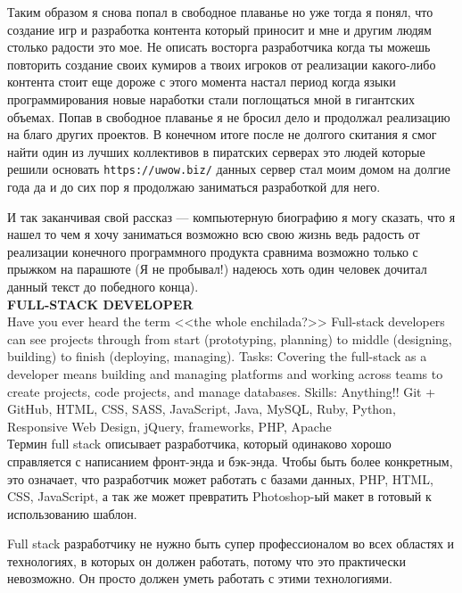\documentclass[14pt,a4paper,oneside]{extbook}
\begin{document}
		Таким образом я снова попал в свободное плаванье но уже тогда я понял, что создание игр и разработка контента который приносит и мне и другим людям столько радости это мое. Не описать восторга разработчика когда ты можешь повторить создание своих кумиров а твоих игроков от реализации какого-либо контента стоит еще дороже с этого момента настал период когда языки программирования новые наработки стали поглощаться мной в гигантских объемах. Попав в свободное плаванье я не бросил дело и продолжал реализацию на благо других проектов. В конечном итоге после не долгого скитания я смог найти один из лучших коллективов в пиратских серверах это людей которые решили основать  \verb|https://uwow.biz/| данных сервер стал моим домом на долгие года да и до сих пор я продолжаю заниматься разработкой для него. 
		
		И так заканчивая свой рассказ --- компьютерную биографию я могу сказать, что я нашел то чем я хочу заниматься возможно всю свою жизнь ведь радость от реализации конечного программного продукта сравнима возможно только с прыжком на парашюте (Я не пробывал!) надеюсь хоть один человек дочитал данный текст до победного конца).\\
		
		\noindent\textbf{FULL-STACK DEVELOPER}\\
		Have you ever heard the term <<the whole enchilada?>> Full-stack developers can see projects through from start (prototyping, planning) to middle (designing, building) to finish (deploying, managing). Tasks: Covering the full-stack as a developer means building and managing platforms and working across teams to create projects, code projects, and manage databases. Skills: Anything!! Git + GitHub, HTML, CSS, SASS, JavaScript, Java, MySQL, Ruby, Python, Responsive Web Design, jQuery, frameworks, PHP, Apache\\
		
		Термин full stack описывает разработчика, который одинаково хорошо справляется с написанием фронт-энда и бэк-энда. Чтобы быть более конкретным, это означает, что разработчик может работать с базами данных, PHP, HTML, CSS, JavaScript, а так же может превратить Photoshop-ый макет в готовый к использованию шаблон.
		
		Full stack разработчику не нужно быть супер профессионалом во всех областях и технологиях, в которых он должен работать, потому что это практически невозможно. Он просто должен уметь работать с этими технологиями.\\
		
\end{document}
